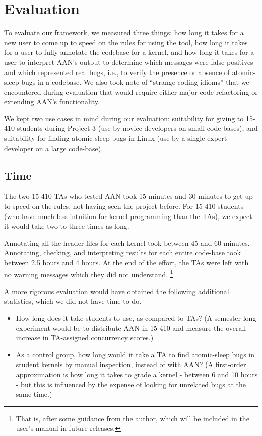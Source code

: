 \documentclass{article}
\begin{document}

\section{Evaluation}

To evaluate our framework, we measured three things:
how long it takes for a new user to come up to speed on the rules for using the tool,
how long it takes for a user to fully annotate the codebase for a kernel,
and how long it takes for a user to interpret AAN's output to determine which messages were false positives and which represented real bugs, i.e., to verify the presence or absence of atomic-sleep bugs in a codebase.
We also took note of ``strange coding idioms'' that we encountered during evaluation that would require either major code refactoring or extending AAN's functionality.

We kept two use cases in mind during our evaluation: suitability for giving to 15-410 students during Project 3 (use by novice developers on small code-bases), and suitability for finding atomic-sleep bugs in Linux (use by a single expert developer on a large code-base).

\subsection{Time}

The two 15-410 TAs who tested AAN took 15 minutes and 30 minutes to get up to speed on the rules, not having seen the project before. For 15-410 students (who have much less intuition for kernel programming than the TAs), we expect it would take two to three times as long.

Annotating all the header files for each kernel took between 45 and 60 minutes. Annotating, checking, and interpreting results for each entire code-base took between 2.5 hours and 4 hours. At the end of the effort, the TAs were left with no warning messages which they did not understand.
\footnote{That is, after some guidance from the author, which will be included in the user's manual in future releases.}

A more rigorous evaluation would have obtained the following additional statistics, which we did not have time to do.
\begin{itemize}
	\item How long does it take students to use, as compared to TAs? (A semester-long experiment would be to distribute AAN in 15-410 and measure the overall increase in TA-assigned concurrency scores.)
	\item As a control group, how long would it take a TA to find atomic-sleep bugs in student kernels by manual inspection, instead of with AAN? (A first-order approximation is how long it takes to grade a kernel - between 6 and 10 hours - but this is influenced by the expense of looking for unrelated bugs at the same time.)
\end{itemize}
\end{document}
